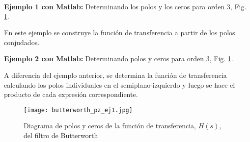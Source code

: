 \documentclass[informe.tex]{subfiles}
\begin{document}
    		
\textbf{Ejemplo 1 con Matlab:} Determinando los polos y los ceros para orden 3, Fig. \ref{fig:func:butterworth:ej1}.\newline 
   
En este ejemplo se construye la función de transferencia a partir de los polos conjudados.\newline


		 	
\textbf{Ejemplo 2 con Matlab:} Determinando polos y ceros para orden 3, Fig. \ref{fig:func:butterworth:ej1}.\newline  
  
A diferencia del ejemplo anterior, se determina la función de transferencia calculando los polos individuales en el semiplano-izquierdo y luego se hace el producto de cada expresión correspondiente.\newline 

   		
    
\begin{figure}
		\centering
		\texttt{[image: butterworth\_pz\_ej1.jpg]}
		\caption{Diagrama de polos y ceros de la función de transferencia, $H(s)$, del filtro de Butterworth}
		\label{fig:func:butterworth:ej1}
\end{figure}   
    		
\end{document}
